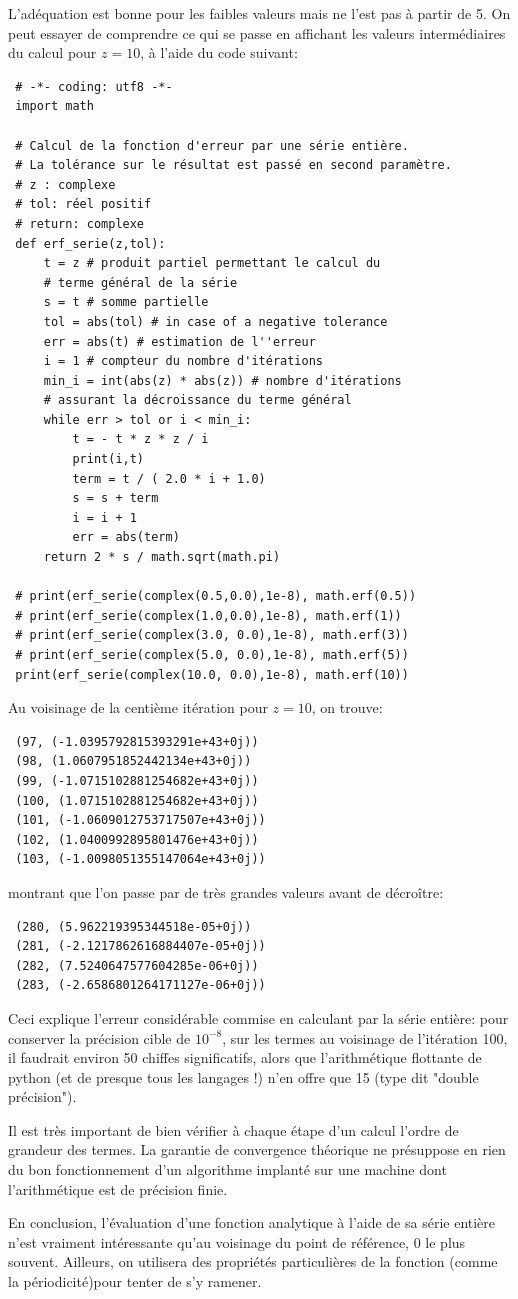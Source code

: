  L'adéquation est bonne pour les faibles valeurs mais ne l'est pas à partir de 5. On peut essayer de comprendre ce qui se passe en affichant les valeurs intermédiaires du calcul pour $z=10$, à l'aide du code suivant:
 \begin{verbatim}
 # -*- coding: utf8 -*-
 import math
 
 # Calcul de la fonction d'erreur par une série entière. 
 # La tolérance sur le résultat est passé en second paramètre.
 # z : complexe
 # tol: réel positif
 # return: complexe
 def erf_serie(z,tol):
     t = z # produit partiel permettant le calcul du 
     # terme général de la série
     s = t # somme partielle
     tol = abs(tol) # in case of a negative tolerance
     err = abs(t) # estimation de l''erreur
     i = 1 # compteur du nombre d'itérations
     min_i = int(abs(z) * abs(z)) # nombre d'itérations
     # assurant la décroissance du terme général
     while err > tol or i < min_i:
         t = - t * z * z / i
         print(i,t)
         term = t / ( 2.0 * i + 1.0)
         s = s + term
         i = i + 1 
         err = abs(term)
     return 2 * s / math.sqrt(math.pi)
 
 # print(erf_serie(complex(0.5,0.0),1e-8), math.erf(0.5))
 # print(erf_serie(complex(1.0,0.0),1e-8), math.erf(1))
 # print(erf_serie(complex(3.0, 0.0),1e-8), math.erf(3))
 # print(erf_serie(complex(5.0, 0.0),1e-8), math.erf(5))
 print(erf_serie(complex(10.0, 0.0),1e-8), math.erf(10))
 \end{verbatim}
 Au voisinage de la centième itération pour $z=10$, on trouve:
 \begin{verbatim}
 (97, (-1.0395792815393291e+43+0j))
 (98, (1.0607951852442134e+43+0j))
 (99, (-1.0715102881254682e+43+0j))
 (100, (1.0715102881254682e+43+0j))
 (101, (-1.0609012753717507e+43+0j))
 (102, (1.0400992895801476e+43+0j))
 (103, (-1.0098051355147064e+43+0j))
 \end{verbatim}
 montrant que l'on passe par de très grandes valeurs avant de décroître:
 \begin{verbatim}
 (280, (5.962219395344518e-05+0j))
 (281, (-2.1217862616884407e-05+0j))
 (282, (7.5240647577604285e-06+0j))
 (283, (-2.6586801264171127e-06+0j))
 \end{verbatim}
 Ceci explique l'erreur considérable commise en calculant par la série entière: pour conserver la précision cible de $10^{-8}$, sur les termes au voisinage de l'itération 100, il faudrait environ 50 chiffes significatifs, alors que l'arithmétique flottante de python (et de presque tous les langages !) n'en offre que 15 (type dit "double précision"). 
 \begin{danger}
 Il est très important de bien vérifier à chaque étape d'un calcul l'ordre de grandeur des termes. La garantie de convergence théorique ne présuppose en rien du bon fonctionnement d'un algorithme implanté sur une machine dont l'arithmétique est de précision finie.
 \end{danger}
 
 En conclusion, l'évaluation d'une fonction analytique à l'aide de sa série entière n'est vraiment intéressante qu'au voisinage du point de référence, 0 le plus souvent. Ailleurs, on utilisera des propriétés particulières de la fonction (comme la périodicité)pour tenter de s'y ramener.